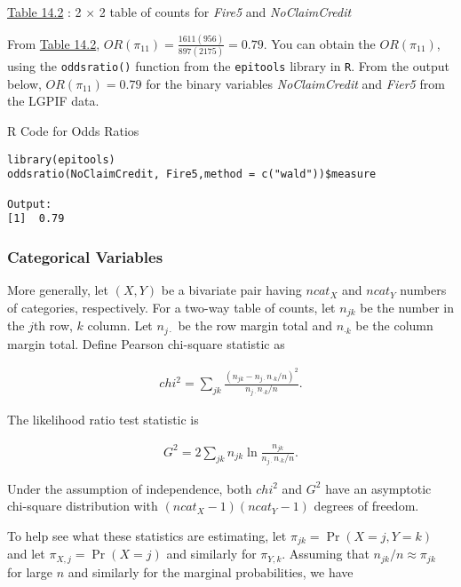 \documentclass[]{book}
\theoremstyle{definition}
\theoremstyle{definition}
\theoremstyle{definition}
\theoremstyle{remark}
\begin{document}
\protect\hyperlink{tab:14.2}{Table 14.2} : 2 \(\times\) 2 table of
counts for \emph{Fire5} and \emph{NoClaimCredit}

From \protect\hyperlink{tab:14.2}{Table 14.2},
\(OR(\pi_{11})=\frac{1611(956)}{897(2175)}=0.79\). You can obtain the
\(OR(\pi_{11})\), using the \texttt{oddsratio()} function from the
\texttt{epitools} library in \texttt{R}. From the output below,
\(OR(\pi_{11})=0.79\) for the binary variables \emph{NoClaimCredit} and
\emph{Fier5} from the LGPIF data.

R Code for Odds Ratios

\hypertarget{display.wald.2}{}
\begin{verbatim}
library(epitools)
oddsratio(NoClaimCredit, Fire5,method = c("wald"))$measure

Output:
[1]  0.79
\end{verbatim}

\subsubsection{Categorical Variables}\label{categorical-variables}

More generally, let \((X,Y)\) be a bivariate pair having \(ncat_X\) and
\(ncat_Y\) numbers of categories, respectively. For a two-way table of
counts, let \(n_{jk}\) be the number in the \(j\)th row, \(k\) column.
Let \(n_{j\cdot}\) be the row margin total and \(n_{\cdot k}\) be the
column margin total. Define Pearson chi-square statistic as

\begin{eqnarray*}
chi^2 = \sum_{jk} \frac{(n_{jk}- n_{j\cdot}n_{\cdot k}/n)^2}{n_{j\cdot}n_{\cdot k}/n} .
\end{eqnarray*}

The likelihood ratio test statistic is

\begin{eqnarray*}
G^2 = 2 \sum_{jk} n_{jk} \ln\frac{n_{jk}}{n_{j\cdot}n_{\cdot k}/n} .
\end{eqnarray*}

Under the assumption of independence, both \(chi^2\) and \(G^2\) have an
asymptotic chi-square distribution with \((ncat_X-1)(ncat_Y-1)\) degrees
of freedom.

To help see what these statistics are estimating, let
\(\pi_{jk} = \Pr(X=j, Y=k)\) and let \(\pi_{X,j}=\Pr(X=j)\) and
similarly for \(\pi_{Y,k}\). Assuming that \(n_{jk}/n \approx \pi_{jk}\)
for large \(n\) and similarly for the marginal probabilities, we have
\end{document}
